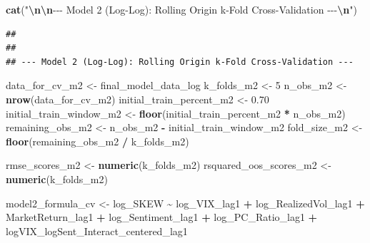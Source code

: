\documentclass[
]{article}
\newenvironment{Shaded}{\begin{snugshade}}{\end{snugshade}}
\newcommand{\DecValTok}[1]{\textcolor[rgb]{0.00,0.00,0.81}{#1}}
\newcommand{\FloatTok}[1]{\textcolor[rgb]{0.00,0.00,0.81}{#1}}
\newcommand{\FunctionTok}[1]{\textcolor[rgb]{0.13,0.29,0.53}{\textbf{#1}}}
\newcommand{\NormalTok}[1]{#1}
\newcommand{\OtherTok}[1]{\textcolor[rgb]{0.56,0.35,0.01}{#1}}
\newcommand{\SpecialCharTok}[1]{\textcolor[rgb]{0.81,0.36,0.00}{\textbf{#1}}}
\newcommand{\StringTok}[1]{\textcolor[rgb]{0.31,0.60,0.02}{#1}}
\begin{document}
\begin{Shaded}
\begin{Highlighting}[]
  \FunctionTok{cat}\NormalTok{(}\StringTok{"}\SpecialCharTok{\textbackslash{}n\textbackslash{}n}\StringTok{{-}{-}{-} Model 2 (Log{-}Log): Rolling Origin k{-}Fold Cross{-}Validation {-}{-}{-}}\SpecialCharTok{\textbackslash{}n}\StringTok{"}\NormalTok{)}
\end{Highlighting}
\end{Shaded}

\begin{verbatim}
## 
## 
## --- Model 2 (Log-Log): Rolling Origin k-Fold Cross-Validation ---
\end{verbatim}

\begin{Shaded}
\begin{Highlighting}[]
\NormalTok{  data\_for\_cv\_m2 }\OtherTok{\textless{}{-}}\NormalTok{ final\_model\_data\_log}
\NormalTok{  k\_folds\_m2 }\OtherTok{\textless{}{-}} \DecValTok{5}
\NormalTok{  n\_obs\_m2 }\OtherTok{\textless{}{-}} \FunctionTok{nrow}\NormalTok{(data\_for\_cv\_m2)}
\NormalTok{  initial\_train\_percent\_m2 }\OtherTok{\textless{}{-}} \FloatTok{0.70}
\NormalTok{  initial\_train\_window\_m2 }\OtherTok{\textless{}{-}} \FunctionTok{floor}\NormalTok{(initial\_train\_percent\_m2 }\SpecialCharTok{*}\NormalTok{ n\_obs\_m2)}
\NormalTok{  remaining\_obs\_m2 }\OtherTok{\textless{}{-}}\NormalTok{ n\_obs\_m2 }\SpecialCharTok{{-}}\NormalTok{ initial\_train\_window\_m2}
\NormalTok{  fold\_size\_m2 }\OtherTok{\textless{}{-}} \FunctionTok{floor}\NormalTok{(remaining\_obs\_m2 }\SpecialCharTok{/}\NormalTok{ k\_folds\_m2)}
  
\NormalTok{  rmse\_scores\_m2 }\OtherTok{\textless{}{-}} \FunctionTok{numeric}\NormalTok{(k\_folds\_m2)}
\NormalTok{  rsquared\_oos\_scores\_m2 }\OtherTok{\textless{}{-}} \FunctionTok{numeric}\NormalTok{(k\_folds\_m2)}
  
\NormalTok{  model2\_formula\_cv }\OtherTok{\textless{}{-}}\NormalTok{ log\_SKEW }\SpecialCharTok{\textasciitilde{}}\NormalTok{ log\_VIX\_lag1 }\SpecialCharTok{+}\NormalTok{ log\_RealizedVol\_lag1 }\SpecialCharTok{+}
\NormalTok{                                 MarketReturn\_lag1 }\SpecialCharTok{+}\NormalTok{ log\_Sentiment\_lag1 }\SpecialCharTok{+}\NormalTok{ log\_PC\_Ratio\_lag1 }\SpecialCharTok{+}
\NormalTok{                                 logVIX\_logSent\_Interact\_centered\_lag1}
  

\end{Highlighting}
\end{Shaded}
\end{document}
